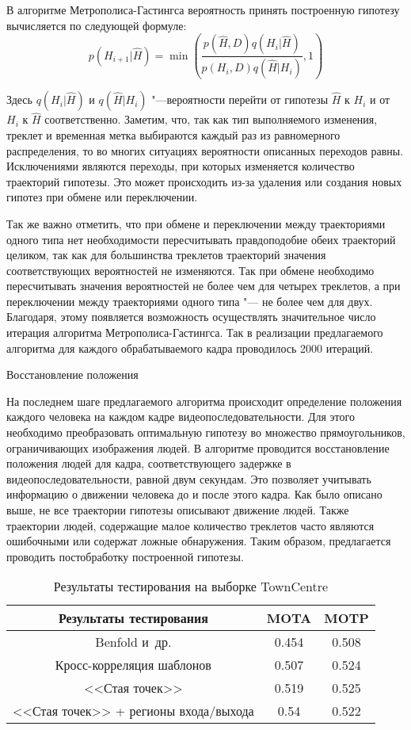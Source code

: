 В алгоритме Метрополиса-Гастингса вероятность принять построенную гипотезу вычисляется по следующей формуле:
\begin{equation}
	p(H_{i+1}|\hat{H}) = \min \left(\frac{p(\hat{H}, D)q(H_i|\hat{H})}{p(H_i, D)q(\hat{H}|H_i)}, 1\right)
\end{equation}

Здесь $q(H_i|\hat{H})$ и $q(\hat{H}|H_i)$ "---вероятности перейти от гипотезы $\hat{H}$ к $H_i$ и от $H_i$ к $\hat{H}$ соответственно. Заметим, что, так как тип выполняемого изменения, треклет и временная метка выбираются каждый раз из равномерного распределения, то во многих ситуациях вероятности описанных переходов равны. Исключениями являются переходы, при которых изменяется количество траекторий гипотезы. Это может происходить из-за удаления или создания новых гипотез при обмене или переключении.

Так же важно отметить, что при обмене и переключении между траекториями одного типа нет необходимости пересчитывать правдоподобие обеих траекторий целиком, так как для большинства треклетов траекторий значения соответствующих вероятностей не изменяются. Так при обмене необходимо пересчитывать значения вероятностей не более чем для четырех треклетов, а при переключении между траекториями одного типа "--- не более чем для двух. Благодаря, этому появляется возможность осуществлять значительное число итерация алгоритма Метрополиса-Гастингса. Так в реализации предлагаемого алгоритма для каждого обрабатываемого кадра проводилось 2000 итераций.

Восстановление положения

На последнем шаге предлагаемого алгоритма происходит определение положения каждого человека на каждом кадре видеопоследовательности. Для этого необходимо преобразовать оптимальную гипотезу во множество прямоугольников, ограничивающих изображения людей. В алгоритме проводится восстановление положения людей для кадра, соответствующего задержке в видеопоследовательности, равной двум секундам. Это позволяет учитывать информацию о движении человека до и после этого кадра. Как было описано выше, не все траектории гипотезы описывают движение людей. Также траектории людей, содержащие малое количество треклетов часто являются ошибочными или содержат ложные обнаружения. Таким образом, предлагается проводить постобработку построенной гипотезы.

\begin{table}[h]
	\caption{Результаты тестирования на выборке TownCentre}\label{sec::tracking:tab::comparison} \centering
	\begin{tabular}{|c|c|c|}
		\hline
		Результаты тестирования & MOTA & MOTP\\
		\hline \hline
		Benfold и~др. \cite{benfold2011stable} & 0.454 & 0.508 \\ \hline
		Кросс-корреляция шаблонов & 0.507 & 0.524 \\ \hline
		<<Стая точек>> & 0.519 & 0.525 \\ \hline
		<<Стая точек>> + регионы входа/выхода & 0.54 & 0.522 \\ \hline
	\end{tabular}
\end{table}

